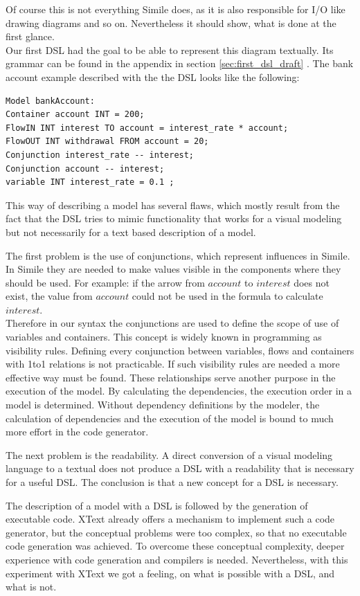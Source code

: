 \par
Of course this is not everything Simile does, as it is also responsible for I/O like drawing diagrams and so on. Nevertheless it should show, what is done at the first glance.\\
Our first DSL had the goal to be able to represent this diagram textually. Its grammar can be found in the appendix in section \ref{sec:first_dsl_draft} . The bank account example described with the the DSL looks like the following:
\begin{lstlisting}[language=firstDSL]
Model bankAccount:
Container account INT = 200;
FlowIN INT interest TO account = interest_rate * account;
FlowOUT INT withdrawal FROM account = 20;
Conjunction interest_rate -- interest;
Conjunction account -- interest;
variable INT interest_rate = 0.1 ;
\end{lstlisting}
\par
This way of describing a model has several flaws, which mostly result from the fact that the DSL tries to mimic functionality that works for a visual modeling but not necessarily for a text based description of a model.
\par
The first problem is the use of conjunctions, which represent influences in Simile. In Simile they are needed to make values visible in the components where they should be used. For example: if the arrow from $account$ to $interest$ does not exist, the value from $account$ could not be used in the formula to calculate $interest$.\\
Therefore in our syntax the conjunctions are used to define the scope of use of variables and containers. This concept is widely known in programming as visibility rules. Defining every conjunction between variables, flows and containers with 1to1 relations is not practicable. If such visibility rules are needed a more effective way must be found.
These relationships serve another purpose in the execution of the model. By calculating the dependencies, the execution order in a model is determined. Without dependency definitions by the modeler, the calculation of dependencies and the execution of the model is bound to much more effort in the code generator.
\par
The next problem is the readability. A direct conversion of a visual modeling language to a textual does not produce a DSL with a readability that is necessary for a useful DSL. The conclusion is that a new concept for a DSL is necessary.
\par
The description of a model with a DSL is followed by the generation of executable code. XText already offers a mechanism to implement such a code generator, but the conceptual problems were too complex, so that no executable code generation was achieved. To overcome these conceptual complexity, deeper experience with code generation and compilers is needed. Nevertheless, with this experiment with XText we got a feeling, on what is possible with a DSL, and what is not. 
